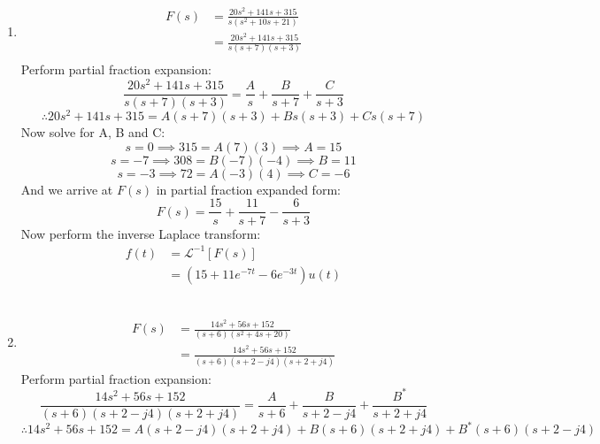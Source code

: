 \begin{enumerate}
	\item{
		\begin{align*}
			F(s) &= \frac{20s^2+141s+315}{s \left(s^2+10s+21 \right)} \\
			&= \frac{20s^2+141s+315}{s(s+7)(s+3)} \\
		\end{align*}
		Perform partial fraction expansion:
		\begin{equation*}
			\frac{20s^2+141s+315}{s(s+7)(s+3)} = \frac{A}{s} + \frac{B}{s+7} + \frac{C}{s+3}
		\end{equation*}
		\begin{equation*}
			\therefore 20s^2+141s+315 = A(s+7)(s+3) + Bs(s+3) + Cs(s+7)
		\end{equation*}
		Now solve for A, B and C:
		\begin{equation*}
			s = 0 \implies 315 = A(7)(3) \implies A = 15
		\end{equation*}
		\begin{equation*}
			s = -7 \implies 308 = B(-7)(-4) \implies B = 11
		\end{equation*}
		\begin{equation*}
			s = -3 \implies 72 = A(-3)(4) \implies C = -6
		\end{equation*}
		And we arrive at $F(s)$ in partial fraction expanded form:
		\begin{equation*}
			F(s) = \frac{15}{s} + \frac{11}{s+7} - \frac{6}{s+3}
		\end{equation*}
		Now perform the inverse Laplace transform:
		\begin{align*}
			f(t) &= \mathcal{L}^{-1}[F(s)] \\
			&= \left(15 + 11e^{-7t} - 6e^{-3t} \right) u(t)
		\end{align*}
		\\
	}
	\item{
		\begin{align*}
			F(s) &= \frac{14s^2+56s+152}{(s+6) \left(s^2+4s+20 \right)} \\
			&= \frac{14s^2+56s+152}{(s+6)(s+2-j4)(s+2+j4)}
		\end{align*}
		Perform partial fraction expansion:
		\begin{equation*}
			\frac{14s^2+56s+152}{(s+6)(s+2-j4)(s+2+j4)} = \frac{A}{s+6} + \frac{B}{s+2-j4} + \frac{B^*}{s+2+j4}
		\end{equation*}
		\begin{equation*}
			\therefore 14s^2+56s+152 = A(s+2-j4)(s+2+j4) + B(s+6)(s+2+j4) + B^*(s+6)(s+2-j4)

\end{equation*}}
\end{enumerate}
